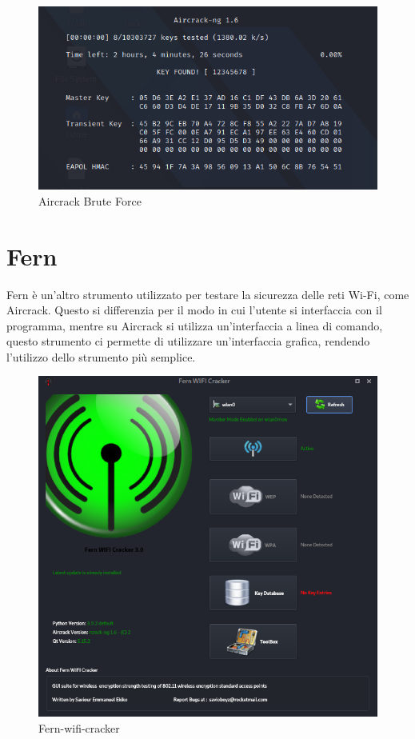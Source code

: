 \begin{figure}[ht]
    \centering
    \includegraphics[width=\linewidth]{Immagini/6/ircrack_6.png}
    \caption{Aircrack Brute Force}
    \label{fig:Aircrack esempio}
\end{figure}

\newpage

\section{Fern}

Fern\cite{fern} è un'altro strumento utilizzato per testare la sicurezza delle reti Wi-Fi, come Aircrack. Questo si differenzia per il modo in cui l'utente si interfaccia con il programma, mentre su Aircrack si utilizza un'interfaccia a linea di comando, questo strumento ci permette di utilizzare un'interfaccia grafica, rendendo l'utilizzo dello strumento più semplice.

\begin{figure}[ht]
    \centering
    \includegraphics[width=\linewidth]{Immagini/6/fern_1.png}
    \caption{Fern-wifi-cracker}
    \label{fig:Fern esempio}
\end{figure}

